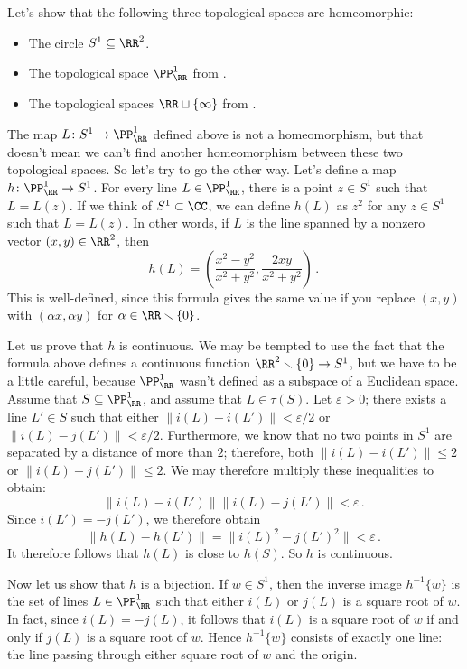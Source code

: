 \begin{exm}
	Let's show that the following three topological spaces are homeomorphic:
	\begin{itemize}
		\item The circle $S^1 \subseteq \RR^2$.
		\item The topological space $\PP^1_{\RR}$ from .
		\item The topological spaces $\RR \sqcup \{\infty\}$ from .
	\end{itemize}

	The map $L \colon S^1 \to \PP^1_{\RR}$ defined above is not a homeomorphism, but that doesn't mean we can't find another homeomorphism between these two topological spaces.
	So let's try to go the other way.
	Let's define a map $ h \colon \PP^1_{\RR} \to S^1$.
	For every line $L \in \PP^1_{\RR}$, there is a point $z \in S^1$ such that $L=L(z)$.
	If we think of $S^1 \subset \CC$, we can define $h(L)$ as $z^2$ for any $z \in S^1$ such that $L = L(z)$.
	In other words, if $L$ is the line spanned by a nonzero vector $(x,y) \in \RR^2$, then
	\[
		h(L) = \left( \frac{x^2-y^2}{x^2+y^2}, \frac{2xy}{x^2+y^2} \right) \period
	\]
	This is well-defined, since this formula gives the same value if you replace $(x,y)$ with $(\alpha x, \alpha y)$ for $\alpha \in \RR \smallsetminus \{0\}$.

	Let us prove that $ h$ is continuous.
	We may be tempted to use the fact that the formula above defines a continuous function $\RR^2 \smallsetminus \{0\} \to S^1$, but we have to be a little careful, because $\PP^1_{\RR}$ wasn't defined as a subspace of a Euclidean space.
	Assume that $S \subseteq \PP^1_{\RR}$, and assume that $L \in \tau(S)$.
	Let $\varepsilon >0$;
	there exists a line $L' \in S$ such that either $\|i(L) - i(L')\| < \varepsilon/2$ or $\|i(L) - j(L')\| < \varepsilon/2$.
	Furthermore, we know that no two points in $S^1$ are separated by a distance of more than $2$;
	therefore, both $\|i(L) - i(L')\| \leq 2$ or $\|i(L) - j(L')\| \leq 2$.
	We may therefore multiply these inequalities to obtain:
	\[
		\|i(L) - i(L')\| \|i(L) - j(L')\| < \varepsilon \period
	\]
	Since $i(L') = -j(L')$, we therefore obtain
	\[
		\|h(L) - h(L')\| = \|i(L)^2 -j(L')^2\| < \varepsilon \period
	\]
	It therefore follows that $h(L)$ is close to $h(S)$.
	So $ h $ is continuous.

	Now let us show that $h$ is a bijection.
	If $ w \in S^1$, then the inverse image $h^{-1}\{w\}$ is the set of lines $L \in \PP^1_{\RR}$ such that either $i(L)$ or $j(L)$ is a square root of $w$.
	In fact, since $i(L) = -j(L)$, it follows that $i(L)$ is a square root of $w$ if and only if $j(L)$ is a square root of $w$.
	Hence $h^{-1}\{w\}$ consists of exactly one line: the line passing through either square root of $w$ and the origin.


\end{exm}
